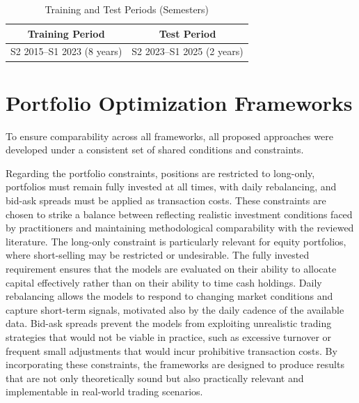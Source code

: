 \begin{table}[ht]
\centering
\caption{Training and Test Periods (Semesters)}
\label{tab:train_test_split}
\begin{tabular}{|c|c|}
\hline
\textbf{Training Period} & \textbf{Test Period} \\
\hline
S2 2015--S1 2023 (8 years) & S2 2023--S1 2025 (2 years) \\
\hline
\end{tabular}
\end{table}

\section{Portfolio Optimization Frameworks}

To ensure comparability across all frameworks, all proposed approaches were developed under a consistent set of shared conditions and constraints.

Regarding the portfolio constraints, positions are restricted to long-only, portfolios must remain fully invested at all times, with daily rebalancing, and bid-ask spreads must be applied as transaction costs. These constraints are chosen to strike a balance between reflecting realistic investment conditions faced by practitioners and maintaining methodological comparability with the reviewed literature. The long-only constraint is particularly relevant for equity portfolios, where short-selling may be restricted or undesirable. The fully invested requirement ensures that the models are evaluated on their ability to allocate capital effectively rather than on their ability to time cash holdings. Daily rebalancing allows the models to respond to changing market conditions and capture short-term signals, motivated also by the daily cadence of the available data. Bid-ask spreads prevent the models from exploiting unrealistic trading strategies that would not be viable in practice, such as excessive turnover or frequent small adjustments that would incur prohibitive transaction costs. By incorporating these constraints, the frameworks are designed to produce results that are not only theoretically sound but also practically relevant and implementable in real-world trading scenarios.

